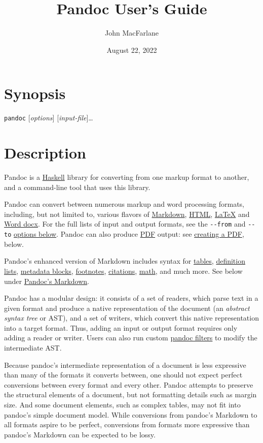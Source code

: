 \documentclass[
]{article}
\title{Pandoc User's Guide}
\author{John MacFarlane}
\date{August 22, 2022}
\begin{document}
\maketitle

\section{Synopsis}\label{synopsis}

\texttt{pandoc} {[}\emph{options}{]} {[}\emph{input-file}{]}\ldots{}

\section{Description}\label{description}

Pandoc is a \href{https://www.haskell.org}{Haskell} library for
converting from one markup format to another, and a command-line tool
that uses this library.

Pandoc can convert between numerous markup and word processing formats,
including, but not limited to, various flavors of
\href{https://daringfireball.net/projects/markdown/}{Markdown},
\href{https://www.w3.org/html/}{HTML},
\href{https://www.latex-project.org/}{LaTeX} and
\href{https://en.wikipedia.org/wiki/Office_Open_XML}{Word docx}. For the
full lists of input and output formats, see the \texttt{-\/-from} and
\texttt{-\/-to} \hyperref[general-options]{options below}. Pandoc can
also produce \href{https://www.adobe.com/pdf/}{PDF} output: see
\hyperref[creating-a-pdf]{creating a PDF}, below.

Pandoc's enhanced version of Markdown includes syntax for
\hyperref[tables]{tables}, \hyperref[definition-lists]{definition
lists}, \hyperref[metadata-blocks]{metadata blocks},
\hyperref[footnotes]{footnotes}, \hyperref[citations]{citations},
\hyperref[math]{math}, and much more. See below under
\hyperref[pandocs-markdown]{Pandoc's Markdown}.

Pandoc has a modular design: it consists of a set of readers, which
parse text in a given format and produce a native representation of the
document (an \emph{abstract syntax tree} or AST), and a set of writers,
which convert this native representation into a target format. Thus,
adding an input or output format requires only adding a reader or
writer. Users can also run custom
\href{https://pandoc.org/filters.html}{pandoc filters} to modify the
intermediate AST.

Because pandoc's intermediate representation of a document is less
expressive than many of the formats it converts between, one should not
expect perfect conversions between every format and every other. Pandoc
attempts to preserve the structural elements of a document, but not
formatting details such as margin size. And some document elements, such
as complex tables, may not fit into pandoc's simple document model.
While conversions from pandoc's Markdown to all formats aspire to be
perfect, conversions from formats more expressive than pandoc's Markdown
can be expected to be lossy.
\end{document}
